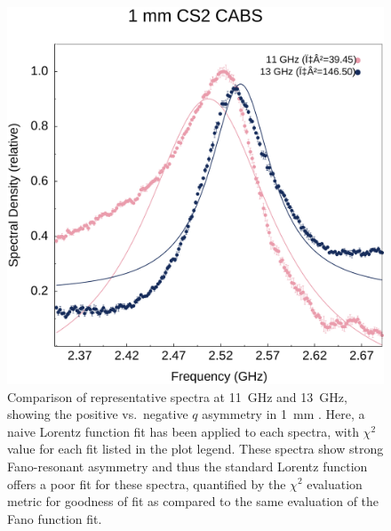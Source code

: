 \begin{figure}[ht]
  \centering
  \includegraphics[width=\textwidth]{figs/4-CABS/CS2LorentzCompare.pdf}
  \caption{Comparison of representative spectra at \SI{11}{\giga\hertz} and \SI{13}{\giga\hertz}, showing the positive vs.\ negative \(q\) asymmetry in \SI{1}{\milli\meter} . Here, a naive Lorentz function fit has been applied to each spectra, with \(\chi^{2}\) value for each fit listed in the plot legend. These spectra show strong Fano-resonant asymmetry and thus the standard Lorentz function offers a poor fit for these spectra, quantified by the \(\chi^{2}\) evaluation metric for goodness of fit as compared to the same evaluation of the Fano function fit.}
  \label{fig:CS2LorentzCompare}
\end{figure}


